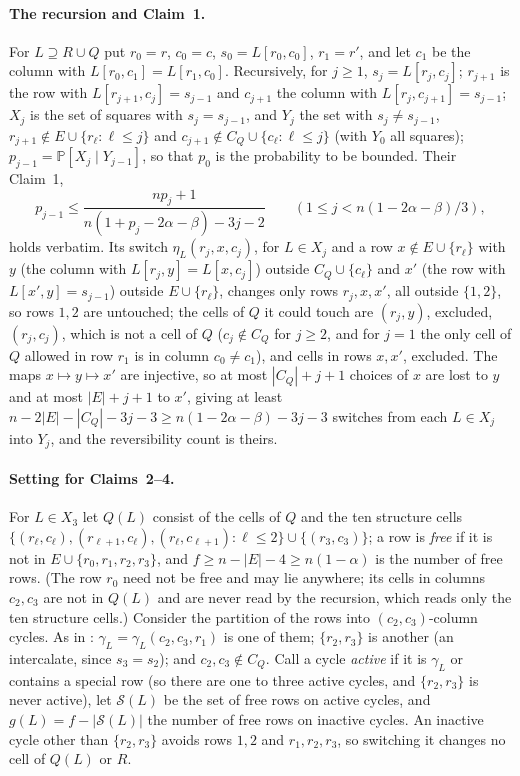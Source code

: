 \documentclass[11pt]{article}
\theoremstyle{definition}
\renewcommand{\Pr}{\mathbb{P}}
\begin{document}
\paragraph{The recursion and Claim~1.}  For $L\supseteq R\cup Q$ put $r_0=r$, $c_0=c$,
$s_0=L[r_0,c_0]$, $r_1=r'$, and let $c_1$ be the column with $L[r_0,c_1]=L[r_1,c_0]$.
Recursively, for $j\ge1$, $s_j=L[r_j,c_j]$; $r_{j+1}$ is the row with $L[r_{j+1},c_j]=s_{j-1}$
and $c_{j+1}$ the column with $L[r_j,c_{j+1}]=s_{j-1}$; $X_j$ is the set of squares with
$s_j=s_{j-1}$, and $Y_j$ the set with $s_j\ne s_{j-1}$, $r_{j+1}\notin E\cup\{r_\ell:\ell\le j\}$
and $c_{j+1}\notin C_Q\cup\{c_\ell:\ell\le j\}$ (with $Y_0$ all squares); $p_{j-1}=\Pr[X_j\mid Y_{j-1}]$,
so that $p_0$ is the probability to be bounded.  Their Claim~1,
\[
p_{j-1}\le\frac{np_j+1}{n(1+p_j-2\alpha-\beta)-3j-2}\qquad(1\le j<n(1-2\alpha-\beta)/3),
\]
holds verbatim.  Its switch $\eta_L(r_j,x,c_j)$, for $L\in X_j$ and a row $x\notin E\cup\{r_\ell\}$
with $y$ (the column with $L[r_j,y]=L[x,c_j]$) outside $C_Q\cup\{c_\ell\}$ and $x'$ (the row
with $L[x',y]=s_{j-1}$) outside $E\cup\{r_\ell\}$, changes only rows $r_j,x,x'$, all outside
$\{1,2\}$, so rows $1,2$ are untouched; the cells of $Q$ it could touch are $(r_j,y)$,
excluded, $(r_j,c_j)$, which is not a cell of $Q$ ($c_j\notin C_Q$ for $j\ge2$, and for $j=1$
the only cell of $Q$ allowed in row $r_1$ is in column $c_0\ne c_1$), and cells in rows
$x,x'$, excluded.  The maps $x\mapsto y\mapsto x'$ are injective, so at most $|C_Q|+j+1$
choices of $x$ are lost to $y$ and at most $|E|+j+1$ to $x'$, giving at least
$n-2|E|-|C_Q|-3j-3\ge n(1-2\alpha-\beta)-3j-3$ switches from each $L\in X_j$ into $Y_j$,
and the reversibility count is theirs.

\paragraph{Setting for Claims~2--4.}  For $L\in X_3$ let $Q(L)$ consist of the cells of $Q$
and the ten structure cells $\{(r_\ell,c_\ell),(r_{\ell+1},c_\ell),(r_\ell,c_{\ell+1}):\ell\le2\}\cup\{(r_3,c_3)\}$;
a row is \emph{free} if it is not in $E\cup\{r_0,r_1,r_2,r_3\}$, and $f\ge n-|E|-4\ge n(1-\alpha)$
is the number of free rows.  (The row $r_0$ need not be free and may lie anywhere; its cells
in columns $c_2,c_3$ are not in $Q(L)$ and are never read by the recursion, which reads
only the ten structure cells.)  Consider the partition of the rows into $(c_2,c_3)$-column
cycles.  As in \cite{AM26}: $\gamma_L=\gamma_L(c_2,c_3,r_1)$ is one of them; $\{r_2,r_3\}$ is
another (an intercalate, since $s_3=s_2$); and $c_2,c_3\notin C_Q$.  Call a cycle
\emph{active} if it is $\gamma_L$ or contains a special row (so there are one to three
active cycles, and $\{r_2,r_3\}$ is never active), let $\mathcal S(L)$ be the set of free
rows on active cycles, and $g(L)=f-|\mathcal S(L)|$ the number of free rows on inactive
cycles.  An inactive cycle other than $\{r_2,r_3\}$ avoids rows $1,2$ and $r_1,r_2,r_3$, so
switching it changes no cell of $Q(L)$ or $R$.
\end{document}
